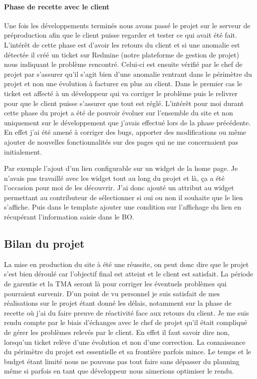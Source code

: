 \documentclass[a4paper,11pt,twoside]{report}
\begin{document}
	\paragraph*{Phase de recette avec le client}
	Une fois les développements terminés nous avons passé le projet sur le serveur de préproduction afin que le client puisse regarder et tester ce qui avait été fait. L'intérêt de cette phase est d'avoir les retours du client et si une anomalie est détectée il créé un ticket sur Redmine (notre plateforme de gestion de projet) nous indiquant le problème rencontré. Celui-ci est ensuite vérifié par le chef de projet par s'assurer qu'il s'agit bien d'une anomalie rentrant dans le périmètre du projet et non une évolution à facturer en plus au client. Dans le premier cas le ticket est affecté à un développeur qui va corriger le problème puis le relivrer pour que le client puisse s'assurer que tout est réglé. 
	L'intérêt pour moi durant cette phase du projet a été de pouvoir évoluer sur l'ensemble du site et non uniquement sur le développement que j'avais effectué lors de la phase précédente. En effet j'ai été amené à corriger des bugs, apporter des modifications ou même ajouter de nouvelles fonctionnalités sur des pages qui ne me concernaient pas initialement. 
	
	Par exemple l'ajout d'un lien configurable sur un widget de la home page. Je n'avais pas travaillé avec les widget tout au long du projet et là, ça a été l'occasion pour moi de les découvrir. J'ai donc ajouté un attribut au widget permettant au contributeur de sélectionner si oui ou non il souhaite que le lien s'affiche. Puis dans le template ajouter une condition sur l'affichage du lien en récupérant l'information saisie dans le BO.  
    \subsection*{Bilan du projet}
    La mise en production du site à été une réussite, on peut donc dire que le projet s'est bien déroulé car l'objectif final est atteint et le client est satisfait. La période de garentie et la TMA seront là pour corriger les éventuels problèmes qui pourraient survenir. D'un point de vu personnel je suis satisfait de mes réalisations sur le projet étant donné les délais, notamment sur la phase de recette où j'ai du faire preuve de réactivité face aux retours du client. Je me suis rendu compte par le biais d'échanges avec le chef de projet qu'il était compliqué de gérer les problèmes relevés par le client. En effet il faut savoir dire non, lorsqu'un ticket relève d'une évolution et non d'une correction. La connaissance du périmètre du projet est essentielle et sa frontière parfois mince. Le temps et le budget étant limité nous ne pouvons pas tout faire sans dépasser du planning même si parfois en tant que développeur nous aimerions optimiser le rendu.
    
\end{document}

